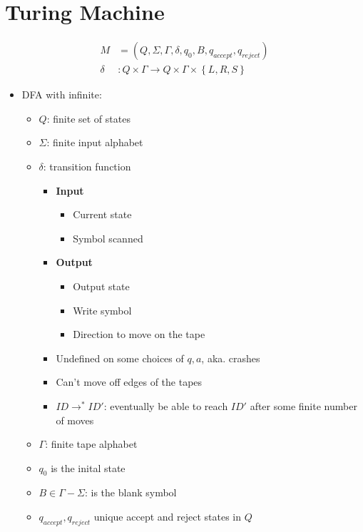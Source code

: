 \chapter{Turing Machine}

\begin{align}
  M &= \left( Q, \Sigma, \Gamma, \delta, q_{0}, B, q_{accept}, q_{reject} \right) \\
  \delta &: Q \times \Gamma \to Q \times \Gamma \times \left\{ L, R, S \right\}
\end{align}

\begin{itemize}
  \item DFA with infinite:
  $ $
  \begin{itemize}
    \item $ Q $: finite set of states
    \item $ \Sigma $: finite input alphabet
    \item $ \delta $: transition function
    \begin{itemize}
      \item \textbf{Input}
      \begin{itemize}
        \item Current state
        \item Symbol scanned
      \end{itemize}

      \item \textbf{Output}
      \begin{itemize}
        \item Output state
        \item Write symbol
        \item Direction to move on the tape
      \end{itemize}

      \item Undefined on some choices of $ q, a $, aka. crashes
      \item Can't move off edges of the tapes
      \item $ ID \to^{*} ID' $: eventually be able to reach $ ID' $ after
      some finite number of moves
    \end{itemize}

    \item $ \Gamma $: finite tape alphabet
    \item $ q_{0} $ is the inital state
    \item $ B \in \Gamma - \Sigma $: is the blank symbol
    \item $ q_{accept}, q_{reject} $ unique accept and reject states in $ Q $
  \end{itemize}


\end{itemize}
